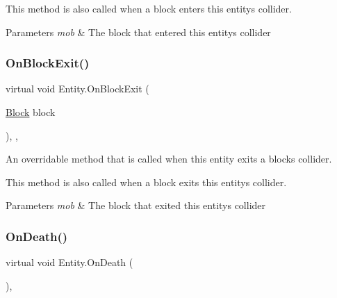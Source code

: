 This method is also called when a block enters this entity\textquotesingle{}s collider. 


\begin{DoxyParams}{Parameters}
{\em mob} & The block that entered this entity\textquotesingle{}s collider \\
\hline
\end{DoxyParams}
\mbox{\label{class_entity_a7d7bec05bad5f327b3265d3514948a5e}} 
\subsubsection{\texorpdfstring{On\+Block\+Exit()}{OnBlockExit()}}
{\footnotesize\ttfamily virtual void Entity.\+On\+Block\+Exit (\begin{DoxyParamCaption}\item[{\mbox{\hyperlink{class_block}{Block}}}]{block }\end{DoxyParamCaption})\hspace{0.3cm}{\ttfamily [inline]}, {\ttfamily [protected]}, {\ttfamily [virtual]}}



An overridable method that is called when this entity exits a block\textquotesingle{}s collider. 

This method is also called when a block exits this entity\textquotesingle{}s collider. 


\begin{DoxyParams}{Parameters}
{\em mob} & The block that exited this entity\textquotesingle{}s collider \\
\hline
\end{DoxyParams}
\mbox{\label{class_entity_a6039178e15537a356d8fde707c9e0b69}} 
\subsubsection{\texorpdfstring{On\+Death()}{OnDeath()}}
{\footnotesize\ttfamily virtual void Entity.\+On\+Death (\begin{DoxyParamCaption}{ }\end{DoxyParamCaption})\hspace{0.3cm}{\ttfamily [inline]}, {\ttfamily [virtual]}}



